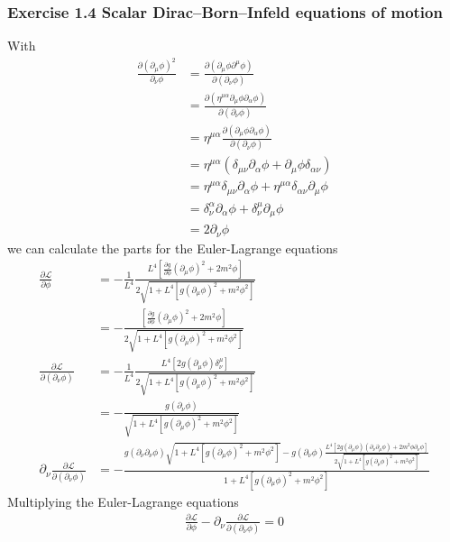 \documentclass[10pt,a4paper]{book}
\theoremstyle{definition}
\begin{document}
\subsubsection{Exercise 1.4 Scalar Dirac–Born–Infeld equations of motion}
With
\begin{align}
\frac{\partial(\partial_\mu\phi)^2}{\partial_\nu\phi}
&=\frac{\partial(\partial_\mu\phi\partial^\mu\phi)}{\partial(\partial_\nu\phi)}\\
&=\frac{\partial(\eta^{\mu\alpha}\partial_\mu\phi\partial_\alpha\phi)}{\partial(\partial_\nu\phi)}\\
&=\eta^{\mu\alpha}\frac{\partial(\partial_\mu\phi\partial_\alpha\phi)}{\partial(\partial_\nu\phi)}\\
&=\eta^{\mu\alpha}(\delta_{\mu\nu}\partial_\alpha\phi+\partial_\mu\phi\delta_{\alpha\nu})\\
&=\eta^{\mu\alpha}\delta_{\mu\nu}\partial_\alpha\phi+\eta^{\mu\alpha}\delta_{\alpha\nu}\partial_\mu\phi\\
&=\delta_\nu^\alpha\partial_\alpha\phi+\delta_\nu^\mu\partial_\mu\phi\\
&=2\partial_\nu\phi
\end{align}
we can calculate the parts for the Euler-Lagrange equations
\begin{align}
\frac{\partial\mathcal{L}}{\partial\phi}
&=-\frac{1}{L^4}\frac{L^4\left[\frac{\partial g}{\partial\phi}(\partial_\mu\phi)^2+2m^2\phi\right]}{2\sqrt{1+L^4[g(\partial_\mu\phi)^2+m^2\phi^2]}}\\
&=-\frac{\left[\frac{\partial g}{\partial\phi}(\partial_\mu\phi)^2+2m^2\phi\right]}{2\sqrt{1+L^4[g(\partial_\mu\phi)^2+m^2\phi^2]}}\\
%
\frac{\partial\mathcal{L}}{\partial(\partial_\nu\phi)}
&=-\frac{1}{L^4}\frac{L^4\left[2g(\partial_\mu\phi)\delta^\mu_\nu\right]}{2\sqrt{1+L^4[g(\partial_\mu\phi)^2+m^2\phi^2]}}\\
&=-\frac{g(\partial_\nu\phi)}{\sqrt{1+L^4[g(\partial_\mu\phi)^2+m^2\phi^2]}}\\
%
\partial_\nu\frac{\partial\mathcal{L}}{\partial(\partial_\nu\phi)}&=-\frac{g(\partial_\nu\partial_\nu\phi)\sqrt{1+L^4[g(\partial_\mu\phi)^2+m^2\phi^2]}-g(\partial_\nu\phi)\frac{L^4[2g(\partial_\mu\phi)(\partial_\nu\partial_\mu\phi)+2m^2\phi\partial_\nu\phi]}{2\sqrt{1+L^4[g(\partial_\mu\phi)^2+m^2\phi^2]}}}{1+L^4[g(\partial_\mu\phi)^2+m^2\phi^2]}
\end{align}
Multiplying the Euler-Lagrange equations 
\begin{align}
\frac{\partial\mathcal{L}}{\partial\phi}-\partial_\nu\frac{\partial\mathcal{L}}{\partial(\partial_\nu\phi)}=0
\end{align}
\end{document}
